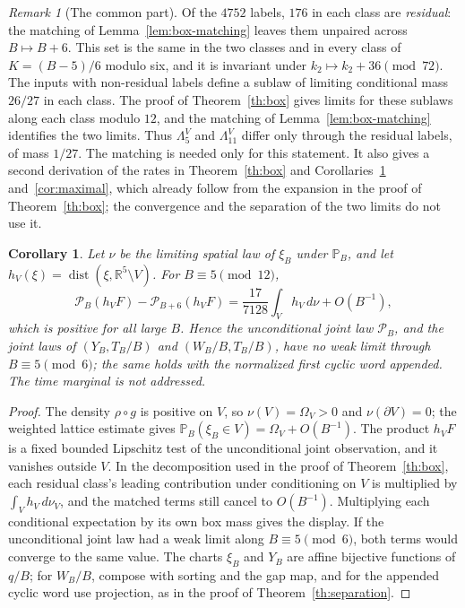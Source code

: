 \documentclass[11pt,reqno]{amsart}
\newtheorem{corollary}[theorem]{Corollary}
\theoremstyle{remark}
\newtheorem{remark}{Remark}
\newcommand{\R}{\mathbb R}
\newcommand{\Prob}{\mathbb P}
\newcommand{\dist}{\operatorname{dist}}
\begin{document}
\begin{remark}[The common part]\label{rem:common}
Of the \(4752\) labels, \(176\) in each class are \emph{residual}: the matching of Lemma~\ref{lem:box-matching} leaves them unpaired across \(B\mapsto B+6\). This set is the same in the two classes and in every class of \(K=(B-5)/6\) modulo six, and it is invariant under \(k_2\mapsto k_2+36\pmod{72}\). The inputs with non-residual labels define a sublaw of limiting conditional mass \(26/27\) in each class. The proof of Theorem~\ref{th:box} gives limits for these sublaws along each class modulo \(12\), and the matching of Lemma~\ref{lem:box-matching} identifies the two limits. Thus \(\Lambda^V_5\) and \(\Lambda^V_{11}\) differ only through the residual labels, of mass \(1/27\). The matching is needed only for this statement. It also gives a second derivation of the rates in Theorem~\ref{th:box} and Corollaries~\ref{cor:localized} and~\ref{cor:maximal}, which already follow from the expansion in the proof of Theorem~\ref{th:box}; the convergence and the separation of the two limits do not use it.
\end{remark}

\begin{corollary}\label{cor:localized}
Let \(\nu\) be the limiting spatial law of \(\xi_B\) under \(\Prob_B\), and let \(h_V(\xi)=\dist(\xi,\R^5\setminus V)\). For \(B\equiv5\pmod{12}\),
\[
 \mathcal P_B(h_VF)-\mathcal P_{B+6}(h_VF)
 =\frac{17}{7128}\int_V h_V\,d\nu+O(B^{-1}),
\]
which is positive for all large \(B\). Hence the unconditional joint law \(\mathcal P_B\), and the joint laws of \((Y_B,T_B/B)\) and \((W_B/B,T_B/B)\), have no weak limit through \(B\equiv5\pmod6\); the same holds with the normalized first cyclic word appended. The time marginal is not addressed.
\end{corollary}

\begin{proof}
The density \(\rho\circ g\) is positive on \(V\), so \(\nu(V)=\Omega_V>0\) and \(\nu(\partial V)=0\); the weighted lattice estimate gives \(\Prob_B(\xi_B\in V)=\Omega_V+O(B^{-1})\). The product \(h_VF\) is a fixed bounded Lipschitz test of the unconditional joint observation, and it vanishes outside \(V\). In the decomposition used in the proof of Theorem~\ref{th:box}, each residual class's leading contribution under conditioning on \(V\) is multiplied by \(\int_V h_V\,d\nu_V\), and the matched terms still cancel to \(O(B^{-1})\). Multiplying each conditional expectation by its own box mass gives the display. If the unconditional joint law had a weak limit along \(B\equiv5\pmod6\), both terms would converge to the same value. The charts \(\xi_B\) and \(Y_B\) are affine bijective functions of \(q/B\); for \(W_B/B\), compose with sorting and the gap map, and for the appended cyclic word use projection, as in the proof of Theorem~\ref{th:separation}.
\end{proof}
\end{document}
